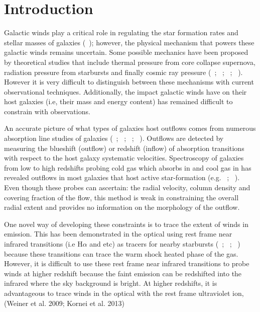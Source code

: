 \documentclass[twocolumn]{aastex61}
\newcommand{\citeth}[1]{(\citeauthor{#1}\ \citeyear{#1})}
\newcommand{\citethnop}[1]{\citeauthor{#1}\ \citeyear{#1}}
\begin{document}

\section{Introduction}\label{sec:intro}
Galactic winds play a critical role in regulating the star formation rates and stellar masses of galaxies \citeth{Werk_2014}; however, the physical mechanism that powers these galactic winds remains uncertain. Some possible mechanics have been proposed by theoretical studies that include thermal pressure from core collapse supernova, radiation pressure from starbursts and finally cosmic ray pressure (\citethnop{Larson_1974}; \citethnop{Chevalier_1985}; \citethnop{Springel_2003}; \citethnop{Sugahara_2017}). However it is very difficult to distinguish between these mechanisms with current observational techniques. Additionally, the impact galactic winds have on their host galaxies (i.e, their mass and energy content) has remained difficult to constrain with observations.

An accurate picture of what types of galaxies host outflows comes from numerous absorption line studies of galaxies (\citethnop{Veilleux2005}; \citethnop{Weiner2009}; \citethnop{Martin2012}; \citethnop{Rubin_2014}). Outflows are detected by measuring the blueshift (outflow) or redshift (inflow) of absorption transitions with respect to the host galaxy systematic velocities. Spectroscopy of galaxies from low to high redshifts probing cold gas which absorbs in  and cool gas in  has revealed outflows in most galaxies that host active star-formation (e.g. \citethnop{Martin2012}; \citethnop{Rubin_2014}). Even though these probes can ascertain: the radial velocity, column density and covering fraction of the flow, this method is weak in constraining the overall radial extent and provides no information on the morphology of the outflow.

One novel way of developing these constraints is to trace the extent of winds in emission. This has been demonstrated in the optical using rest frame near infrared transitions (i.e H$\alpha$ and  etc) as tracers for nearby starbursts (\citethnop{Matsubayashi2009}; \citethnop{Veilleux2009}; \citethnop{Tripp2011}) because these transitions can trace the warm shock heated phase of the gas. However, it is difficult to use these rest frame near infrared transitions to probe winds at higher redshift because the faint emission can be redshifted into the infrared where the sky background is bright. At higher redshifts, it is advantageous to trace winds in the optical with the rest frame ultraviolet ion,  (Weiner et al. 2009; Kornei et al. 2013)\nocite{Weiner2009, Kornei2013}
\end{document}
